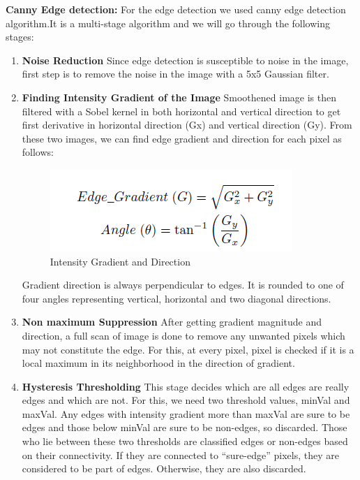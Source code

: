 \documentclass[12pt, a4paper]{article}
\begin{document}
\textbf{Canny Edge detection:}
For the edge detection we used canny edge detection algorithm.It is a multi-stage algorithm and we will go through the following stages:
\begin{enumerate}
\item \textbf {Noise Reduction}
Since edge detection is susceptible to noise in the image, first step is to remove the noise in the image with a 5x5 Gaussian filter.

\item \textbf{Finding Intensity Gradient of the Image}
Smoothened image is then filtered with a Sobel kernel in both horizontal and vertical direction to get first derivative in horizontal direction (Gx) and vertical direction (Gy). From these two images, we can find edge gradient and direction for each pixel as follows:
\begin{figure}[htp]
\centering
\includegraphics[scale=0.7]{canny.png}
\caption{Intensity Gradient and Direction}
\label{}
\end{figure}
Gradient direction is always perpendicular to edges. It is rounded to one of four angles   representing vertical, horizontal and two diagonal directions.
\item \textbf{Non maximum Suppression}
After getting gradient magnitude and direction, a full scan of image is done to remove any unwanted pixels which may not constitute the edge. For this, at every pixel, pixel is checked ­if it is a local maximum in its neighborhood in the direction of gradient.

\item \textbf{Hysteresis Thresholding}
This stage decides which are all edges are really edges and which are not. For this, we need two threshold values, minVal and maxVal. Any edges with intensity gradient more than maxVal are sure to be edges and those below minVal are sure to be non-edges, so discarded. Those who lie between these two thresholds are classified edges or non-edges based on their connectivity. If they are connected to “sure-edge” pixels, they are considered to be part of edges. Otherwise, they are also discarded.
\end{enumerate}
	
\end{document}
